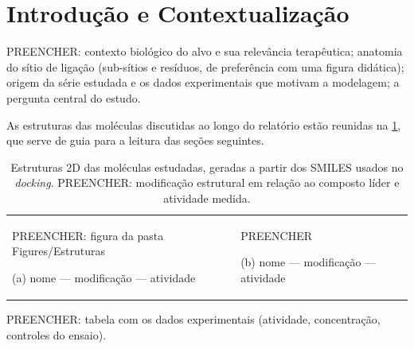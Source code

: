 \section{Introdução e Contextualização} \label{section: introduction}

PREENCHER: contexto biológico do alvo e sua relevância terapêutica; anatomia do sítio de ligação (sub-sítios e resíduos, de preferência com uma figura didática); origem da série estudada e os dados experimentais que motivam a modelagem; a pergunta central do estudo.

As estruturas das moléculas discutidas ao longo do relatório estão reunidas na \cref{tab:estruturas}, que serve de guia para a leitura das seções seguintes.

\begin{table}[p]
\centering
\caption{Estruturas 2D das moléculas estudadas, geradas a partir dos SMILES usados no \textit{docking}. PREENCHER: modificação estrutural em relação ao composto líder e atividade medida.}
\label{tab:estruturas}
\renewcommand{\arraystretch}{1.1}
\begin{tabular}{>{\centering\arraybackslash}m{} >{\centering\arraybackslash}m{}}
PREENCHER: figura da pasta Figures/Estruturas \par (a) nome --- modificação --- atividade &
PREENCHER \par (b) nome --- modificação --- atividade \\
\end{tabular}
\end{table}

PREENCHER: tabela com os dados experimentais (atividade, concentração, controles do ensaio).
